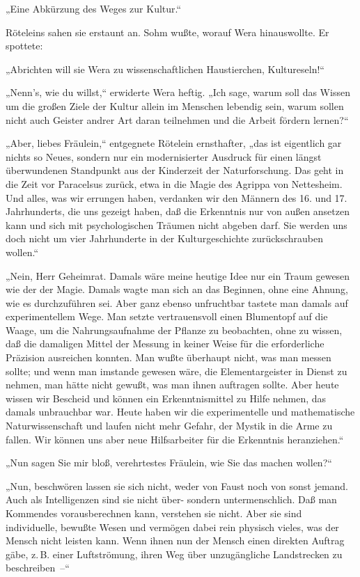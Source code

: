 „Eine Abkürzung des Weges zur Kultur.“

Röteleins sahen sie erstaunt an. Sohm wußte, worauf Wera
hinauswollte. Er spottete:

„Abrichten will sie Wera zu wissenschaftlichen Haustierchen,
Kultureseln!“

„Nenn's, wie du willst,“ erwiderte Wera heftig. „Ich sage, warum
soll das Wissen um die großen Ziele der Kultur allein im Menschen
lebendig sein, warum sollen nicht auch Geister andrer Art daran
teilnehmen und die Arbeit fördern lernen?“

„Aber, liebes Fräulein,“ entgegnete Rötelein ernsthafter, „das ist
eigentlich gar nichts so Neues, sondern nur ein modernisierter
Ausdruck für einen längst überwundenen Standpunkt aus der
Kinderzeit der Naturforschung. Das geht in die Zeit vor Paracelsus
zurück, etwa in die Magie des Agrippa von Nettesheim. Und alles,
was wir errungen haben, verdanken wir den Männern des 16. und
17.\,Jahrhunderts, die uns gezeigt haben, daß die Erkenntnis nur von
außen ansetzen kann und sich mit psychologischen Träumen nicht
abgeben darf. Sie werden uns doch nicht um vier Jahrhunderte in der
Kulturgeschichte zurückschrauben wollen.“

„Nein, Herr Geheimrat. Damals wäre meine heutige Idee nur ein Traum
gewesen wie der der Magie. Damals wagte man sich an das Beginnen,
ohne eine Ahnung, wie es durchzuführen sei. Aber ganz ebenso
unfruchtbar tastete man damals auf experimentellem Wege. Man setzte
vertrauensvoll einen Blumentopf auf die Waage, um die
Nahrungsaufnahme der Pflanze zu beobachten, ohne zu wissen, daß die
damaligen Mittel der Messung in keiner Weise für die erforderliche
Präzision ausreichen konnten. Man wußte überhaupt nicht, was man
messen sollte; und wenn man imstande gewesen wäre, die
Elementargeister in Dienst zu nehmen, man hätte nicht gewußt, was
man ihnen auftragen sollte. Aber heute wissen wir Bescheid und
können ein Erkenntnismittel zu Hilfe nehmen, das damals unbrauchbar
war. Heute haben wir die experimentelle und mathematische
Naturwissenschaft und laufen nicht mehr Gefahr, der Mystik in die
Arme zu fallen. Wir können uns aber neue Hilfsarbeiter für die
Erkenntnis heranziehen.“

„Nun sagen Sie mir bloß, verehrtestes Fräulein, wie Sie das machen
wollen?“

„Nun, beschwören lassen sie sich nicht, weder von Faust noch von
sonst jemand. Auch als Intelligenzen sind sie nicht über- sondern
untermenschlich. Daß man Kommendes vorausberechnen kann, verstehen
sie nicht. Aber sie sind individuelle, bewußte Wesen und vermögen
dabei rein physisch vieles, was der Mensch nicht leisten kann. Wenn
ihnen nun der Mensch einen direkten Auftrag gäbe, z.\,B. einer
Luftströmung, ihren Weg über unzugängliche Landstrecken zu
beschreiben~–“

